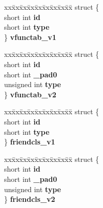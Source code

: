 \begin{DoxyCompactItemize}
\begin{tabbing}
\end{tabbing}\item 
\mbox{\label{unioncodeview__fieldtype_a7855ac2b72a439a2f6e8b2dfdaecca47}} 
\begin{tabbing}
xx\=xx\=xx\=xx\=xx\=xx\=xx\=xx\=xx\=\kill
struct \{\\
\>short int {\bfseries id}\\
\>short int {\bfseries type}\\
\} {\bfseries vfunctab\_v1}\\

\end{tabbing}\item 
\mbox{\label{unioncodeview__fieldtype_a80d596f55c0581963835a9ac204fdf5e}} 
\begin{tabbing}
xx\=xx\=xx\=xx\=xx\=xx\=xx\=xx\=xx\=\kill
struct \{\\
\>short int {\bfseries id}\\
\>short int {\bfseries \_pad0}\\
\>unsigned int {\bfseries type}\\
\} {\bfseries vfunctab\_v2}\\

\end{tabbing}\item 
\mbox{\label{unioncodeview__fieldtype_a13d98733de62dbe366ef50a3a362aa6f}} 
\begin{tabbing}
xx\=xx\=xx\=xx\=xx\=xx\=xx\=xx\=xx\=\kill
struct \{\\
\>short int {\bfseries id}\\
\>short int {\bfseries type}\\
\} {\bfseries friendcls\_v1}\\

\end{tabbing}\item 
\mbox{\label{unioncodeview__fieldtype_a0a7eee63b06533dc32493e99c8c25aec}} 
\begin{tabbing}
xx\=xx\=xx\=xx\=xx\=xx\=xx\=xx\=xx\=\kill
struct \{\\
\>short int {\bfseries id}\\
\>short int {\bfseries \_pad0}\\
\>unsigned int {\bfseries type}\\
\} {\bfseries friendcls\_v2}\\


\end{tabbing}
\end{DoxyCompactItemize}
